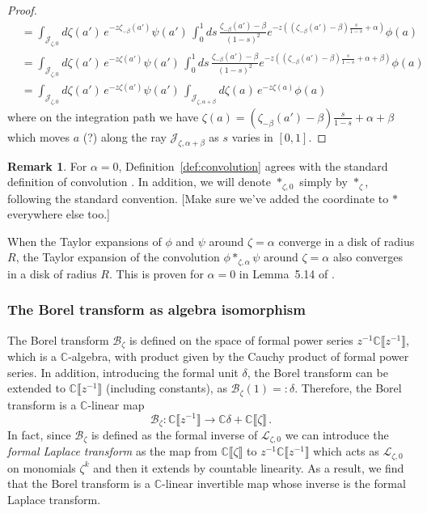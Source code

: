 \documentclass{article}
\newcommand{\C}{\mathbb{C}}
\newcommand{\laplace}{\mathcal{L}}
\newcommand{\borel}{\mathcal{B}}
\theoremstyle{definition}
\newtheorem{remark}[definition]{Remark}
\theoremstyle{plain}
\newenvironment{todo}{\color{Coral}}{\color{black}}
\newenvironment{revised}{\color{DarkBlue}}{\color{black}}
\newenvironment{revised}{}{}
\begin{document}
\begin{proof}
\begin{revised}
\begin{align*}
&=\int_{\mathcal{J}_{\zeta,0}}d\zeta(a') \,e^{-z\zeta_{-\beta}(a')}  \psi(a') \,\int_0^1 ds\,\frac{\zeta_{-\beta}(a')-\beta}{(1-s)^2}e^{-z((\zeta_{-\beta}(a')-\beta) \frac{s}{1-s}+\alpha)} \phi(a)\\
&=\int_{\mathcal{J}_{\zeta,0}}d\zeta(a') \,e^{-z\zeta(a')}  \psi(a') \,\int_0^1 ds\,\frac{\zeta_{-\beta}(a')-\beta}{(1-s)^2}e^{-z((\zeta_{-\beta}(a')-\beta) \frac{s}{1-s}+\alpha+\beta)} \phi(a)\\
&=\int_{\mathcal{J}_{\zeta,0}}d\zeta(a') \,e^{-z\zeta(a')}  \psi(a') \,\int_{\mathcal{J}_{\zeta,\alpha+\beta}} d\zeta(a)\, e^{-z\zeta(a)} \phi(a)
\end{align*}
where on the integration path we have $\zeta(a)=(\zeta_{-\beta}(a')-\beta)\frac{s}{1-s}+\alpha+\beta$ which moves $a$ \begin{todo}(?)\end{todo} along the ray $\mathcal{J}_{\zeta,\alpha+\beta}$ as $s$ varies in $[0,1]$.
\end{revised}
\end{proof}
%
\begin{remark}
For $\alpha=0$, Definition~\ref{def:convolution} agrees with the standard definition of convolution \cite[Definition~5.12]{diverg-resurg-i}.
In addition, we will denote $\ast_{\zeta,0}$ simply by $\ast_\zeta$, following the standard convention. \begin{todo}[Make sure we've added the coordinate to $\ast$ everywhere else too.]\end{todo}
\end{remark}
When the Taylor expansions of $\phi$ and $\psi$ around $\zeta=\alpha$ converge in a disk of radius $R$, the Taylor expansion of the convolution $\phi\ast_{\zeta,\alpha}\psi$ around $\zeta=\alpha$ also converges in a disk of radius $R$. This is proven for $\alpha = 0$ in Lemma~5.14 of \cite{diverg-resurg-i}.
%
\subsubsection*{The Borel transform as algebra isomorphism}
%
The Borel transform $\borel_\zeta$ is defined on the space of formal power series $z^{-1}\C\llbracket z^{-1}\rrbracket$, which is a $\C$-algebra, with product given by the Cauchy product of formal power series. In addition, introducing the formal unit $\delta$, the Borel transform can be extended to $\C\llbracket z^{-1}\rrbracket$ (including constants), as $\borel_\zeta(1)=:\delta$. Therefore, the Borel transform is a $\C$-linear map
 \[\borel_\zeta\colon\C\llbracket z^{-1}\rrbracket\to\C\delta + \C\llbracket\zeta\rrbracket\,.\] 
In fact, since $\borel_\zeta$ is defined as the formal inverse of $\laplace_{\zeta,0}$ we can introduce the \textit{formal Laplace transform} as the map from $\C\llbracket \zeta\rrbracket$ to $z^{-1}\C\llbracket z^{-1}\rrbracket$ which acts as $\laplace_{\zeta,0}$ on monomials $\zeta^k$ and then it extends by countable linearity. As a result, we find that the Borel transform is a $\C$-linear invertible map whose inverse is the formal Laplace transform.
\end{document}
